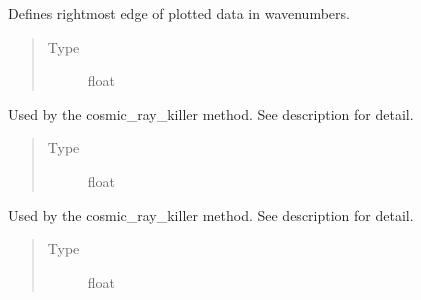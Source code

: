 \documentclass[a4paper,10pt,english]{sphinxmanual}
\begin{document}
\begin{fulllineitems}
\begin{fulllineitems}
\begin{quote}
\begin{description}
\end{description}\end{quote}

\end{fulllineitems}


\begin{fulllineitems}
\label{\detokenize{sfgtools:sfgtools.SFGProcessTools.custom_region_end}}
\sphinxAtStartPar
Defines rightmost edge of plotted data in wavenumbers.
\begin{quote}\begin{description}
\item[{Type}] \leavevmode
\sphinxAtStartPar
float

\end{description}\end{quote}

\end{fulllineitems}


\begin{fulllineitems}
\label{\detokenize{sfgtools:sfgtools.SFGProcessTools.cosmic_threshold}}
\sphinxAtStartPar
Used by the cosmic\_ray\_killer method. See description for detail.
\begin{quote}\begin{description}
\item[{Type}] \leavevmode
\sphinxAtStartPar
float

\end{description}\end{quote}

\end{fulllineitems}


\begin{fulllineitems}
\label{\detokenize{sfgtools:sfgtools.SFGProcessTools.cosmic_max_width}}
\sphinxAtStartPar
Used by the cosmic\_ray\_killer method. See description for detail.
\begin{quote}\begin{description}
\item[{Type}] \leavevmode
\sphinxAtStartPar
float


\end{description}
\end{quote}
\end{fulllineitems}
\end{fulllineitems}
\end{document}
